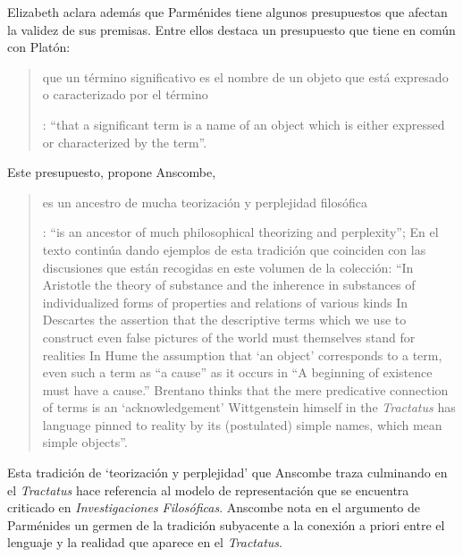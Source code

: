 Elizabeth aclara además que Parménides tiene algunos presupuestos que afectan la validez de sus premisas. Entre ellos destaca un presupuesto que tiene en común con Platón: \blockquote[{\Cite[x]{anscombe1981parmenides}}: \enquote{that a significant term is a name of an object which is either expressed or characterized by the term}.]{que un término significativo es el nombre de un objeto que está expresado o caracterizado por el término}. Este presupuesto, propone Anscombe, \blockquote[{\Cite[xi]{anscombe1981parmenides}}: \enquote{is an ancestor of much philosophical theorizing and perplexity}; En el texto continúa dando ejemplos de esta tradición que coinciden con las discusiones que están recogidas en este volumen de la colección: \enquote{In Aristotle \textelp{} the theory of substance and the inherence in substances of individualized forms of properties and relations of various kinds \textelp{} In Descartes \textelp{} the assertion that the descriptive terms which we use to construct even false pictures of the world must themselves stand for realities \textelp{} In Hume \textelp{} the assumption that `an object' corresponds to a term, even such a term as ``a cause'' as it occurs in ``A beginning of existence must have a cause.'' \textelp{} Brentano thinks that the mere predicative connection of terms is an `acknowledgement' \textelp{} Wittgenstein himself in the \emph{Tractatus} has language pinned to reality by its (postulated) simple names, which mean simple objects}.]{es un ancestro de mucha teorización y perplejidad filosófica}.
Esta tradición de \enquote*{teorización y perplejidad} que Anscombe traza culminando en el \emph{Tractatus} hace referencia al modelo de representación que se encuentra criticado en \emph{Investigaciones Filosóficas}. Anscombe nota en el argumento de Parménides un germen de la tradición subyacente a la conexión a priori entre el lenguaje y la realidad que aparece en el \emph{Tractatus}.

